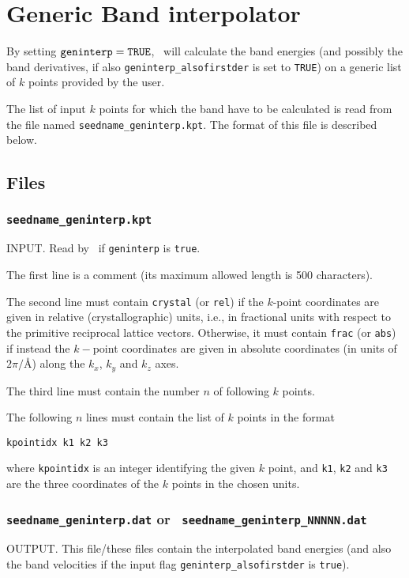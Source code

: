 \chapter{Generic Band interpolator}\label{ch:geninterp}

By setting $\verb#geninterp#=\verb#TRUE#$, \postw\ will calculate the
band energies (and possibly the band derivatives, if also
\verb#geninterp_alsofirstder# is set to \verb#TRUE#) on a generic list
of $k$ points provided by the user.

The list of input $k$ points for which the band have to be calculated
is read from the file named {\tt seedname\_geninterp.kpt}. The format
of this file is
described below. 

\section{Files}
\subsection{{\tt seedname\_geninterp.kpt}}
INPUT. Read by \postw\ if {\tt geninterp} is \verb#true#. 

The first line is a comment (its maximum allowed length is 500
characters).

The second line must contain \verb#crystal# (or \verb#rel#) if the
$k$-point coordinates are given in relative (crystallographic) units,
i.e., in fractional units with respect to the primitive reciprocal
lattice vectors.
Otherwise, it must contain \verb#frac# (or \verb#abs#) if instead the
$k-$point coordinates are given in absolute 
coordinates (in units of $2\pi/$\AA) along the $k_x$, $k_y$ and $k_z$
axes.

The third line must contain the number $n$ of following $k$ points.

The following $n$ lines must contain the list of $k$ points in the
format
\begin{verbatim}
kpointidx k1 k2 k3
\end{verbatim}
where \verb#kpointidx# is an integer identifying the given $k$ point,
and \verb#k1#, \verb#k2# and \verb#k3# are the three coordinates of the
$k$ points in the chosen units.


\subsection{{\tt seedname\_geninterp.dat} or {\tt
    seedname\_geninterp\_NNNNN.dat}}
\label{sec:seedname.geninterp.dat}
OUTPUT. This file/these files contain the interpolated band energies (and also the band
velocities if the input flag \verb#geninterp_alsofirstder# is \verb#true#).

